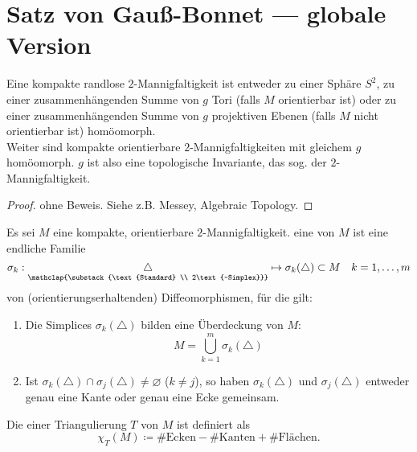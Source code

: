 \section{Satz von Gauß-Bonnet --- globale Version}

\begin{theorem}
  Eine kompakte randlose \( 2 \)-Mannigfaltigkeit ist entweder zu einer Sphäre \( S^2 \), zu einer zusammenhängenden Summe von \( g \) Tori (falls \( M \) orientierbar ist) oder zu einer zusammenhängenden Summe von \( g \) projektiven Ebenen (falls \( M \) nicht orientierbar ist) homöomorph. \\
  Weiter sind kompakte orientierbare \( 2 \)-Mannigfaltigkeiten mit gleichem \( g \) homöomorph. \( g \) ist also eine topologische Invariante, das sog. \label{def:geschlecht} der \( 2 \)-Mannigfaltigkeit.
  \begin{proof}
    ohne Beweis. Siehe z.B. Messey, Algebraic Topology.
  \end{proof}
\end{theorem}

\begin{definition}
  Es sei \( M \) eine kompakte, orientierbare \( 2 \)-Mannigfaltigkeit. eine \label{def:triangulierung} von \( M \) ist eine endliche Familie
  \begin{equation*}
    \sigma_k : \underset{\mathclap{\substack{\text{Standard} \\ 2\text{-Simplex}}}}{\triangle} \mapsto \sigma_k(\triangle) \subset M \quad k = 1,\dots,m
  \end{equation*}
  von (orientierungserhaltenden) Diffeomorphismen, für die gilt:
  \begin{enumerate}
    \item Die Simplices \( \sigma_k(\triangle) \) bilden eine Überdeckung von \( M \):
    \begin{equation*}
      M = \bigcup_{k = 1}^m \sigma_k(\triangle)
    \end{equation*}
    \item Ist \( \sigma_k(\triangle) \cap \sigma_j(\triangle) \neq \varnothing \) (\( k \neq j \)), so haben \( \sigma_k(\triangle) \) und \( \sigma_j(\triangle) \) entweder genau eine Kante oder genau eine Ecke gemeinsam.
  \end{enumerate}
  Die  einer Triangulierung \( T \) von \( M \) ist definiert als
  \begin{equation*}
    \chi_T(M) \coloneqq \#\text{Ecken} - \#\text{Kanten} + \#\text{Flächen.}
  \end{equation*}
\end{definition}

